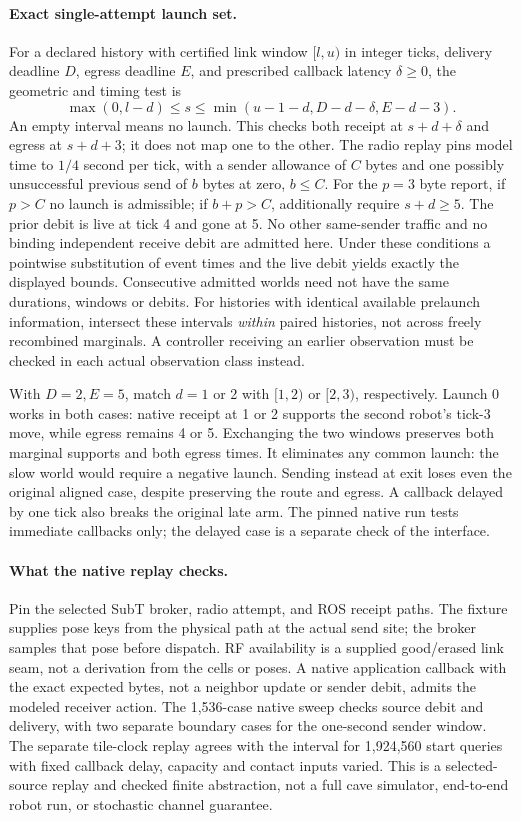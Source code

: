 \documentclass[11pt]{article}
\begin{document}
\paragraph{Exact single-attempt launch set.}
For a declared history with certified link window \([l,u)\) in integer
ticks, delivery deadline \(D\), egress deadline \(E\), and prescribed
callback latency \(\delta\ge0\), the geometric and timing test is
\[
  \max(0,l-d) \le s \le \min(u-1-d,D-d-\delta,E-d-3).
\]
An empty interval means no launch. This checks both receipt at \(s+d+\delta\)
and egress at \(s+d+3\); it does not map one to the other.
The radio replay pins model time to \(1/4\) second per tick, with a sender
allowance of \(C\) bytes and one possibly unsuccessful previous send of
\(b\) bytes at zero, \(b\le C\). For the \(p=3\) byte report, if \(p>C\)
no launch is admissible; if \(b+p>C\), additionally require \(s+d\ge5\).
The prior debit is live at tick 4 and gone at 5. No other same-sender
traffic and no binding independent receive debit are admitted here.
Under these conditions a pointwise substitution of event times and the
live debit yields exactly the displayed bounds. Consecutive admitted
worlds need not have the same durations, windows or debits. For histories
with identical available prelaunch information, intersect these intervals
\emph{within} paired histories, not across freely recombined marginals.
A controller receiving an earlier observation must be checked in each
actual observation class instead.

With \(D=2,E=5\), match \(d=1\) or 2 with \([1,2)\) or \([2,3)\),
respectively. Launch 0 works in both cases: native receipt at 1 or 2
supports the second robot's tick-3 move, while egress remains 4 or 5.
Exchanging the two windows preserves both marginal supports and both
egress times. It eliminates any common launch: the slow world would
require a negative launch. Sending instead at exit loses even the
original aligned case, despite preserving the route and egress.
A callback delayed by one tick also breaks the original late arm.
The pinned native run tests immediate callbacks only; the delayed
case is a separate check of the interface.

\paragraph{What the native replay checks.}
Pin the selected SubT broker, radio attempt, and ROS receipt paths.
The fixture supplies pose keys from the physical path at the actual send
site; the broker samples that pose before dispatch. RF availability is a
supplied good/erased link seam, not a derivation from the cells or poses.
A native application callback with the exact expected bytes, not a
neighbor update or sender debit, admits the modeled receiver action.
The 1,536-case native sweep checks source debit and delivery, with two
separate boundary cases for the one-second sender window. The separate
tile-clock replay agrees with the interval for 1,924,560 start queries
with fixed callback delay, capacity and contact inputs varied. This is
a selected-source replay and checked finite abstraction, not a full
cave simulator, end-to-end robot run, or stochastic channel guarantee.
\end{document}
